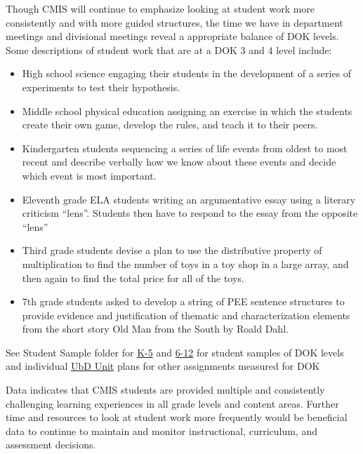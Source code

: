 \documentclass{report}
\begin{document}
\begin{findings}
Though CMIS will  continue to emphasize looking at student work more consistently and with more guided structures, the time we have in department meetings and divisional meetings reveal a appropriate balance of DOK levels. Some descriptions of student work that are at a DOK 3 and 4 level include: 
\begin{itemize}
\item High school science engaging their students in the development of a series of experiments to test their hypothesis.
\item Middle school physical education assigning an exercise in which the students create their own game, develop the rules, and teach it to their peers. 
\item Kindergarten students sequencing a series of life events from oldest to most recent and describe verbally how we know about these events and decide which event is most important. 
\item Eleventh grade ELA students writing an argumentative essay using a literary criticism “lens”. Students then have to respond to the essay from the opposite “lens” 
\item Third grade students devise a plan to use the distributive property of multiplication to find the number of toys in a toy shop in a large array, and then again to find the total price for all of the toys.
\item 7th grade students asked to develop a string of PEE sentence structures to provide evidence and justification of thematic and characterization elements from the short story Old Man from the South by Roald Dahl. 
\end{itemize}

See Student Sample folder for \href{https://drive.google.com/drive/folders/0ByVFfrm0zfolVGJzdXpvLV9reVk?usp=sharing}{K-5} and  \href{https://drive.google.com/drive/folders/0ByVFfrm0zfolMkF5aThoSzZxa1E?usp=sharing}{6-12} for student samples of DOK levels and individual \href{https://docs.google.com/a/cmis.ac.th/document/d/1kL1VjwfuMMa7NaWmwUrEah1BM-jJRmLAd4VJzR3HoPs/edit?usp=sharing}{UbD Unit} plans for other assignments measured for DOK 


Data indicates that CMIS students are provided multiple and consistently challenging learning experiences in all grade levels and content areas. Further time and resources to look at student work more frequently would be beneficial data to continue to maintain and monitor instructional, curriculum, and assessment decisions.  
\end{findings}
\end{document}
